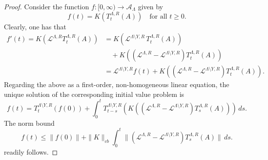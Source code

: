 \documentclass{article}
\newcommand{\A}{\mathcal{A}}
\newcommand{\lind}{\mathscr{L}}
\newcommand{\<}{\langle}
\renewcommand{\>}{\rangle}
\numberwithin{equation}{section}
\theoremstyle{definition}
\begin{document}
\begin{proof}
 Consider the function $f:[0,\infty) \to \A_{\Lambda}$ given by
    \begin{equation} \label{def_f}
        f(t) = K(T^{\Lambda, R}_t(A)) \quad \text{for all $t\ge 0$.}
    \end{equation}
Clearly, one has that 
    \begin{align*}
        f'(t) = K(\mathscr{L}^{\Lambda, R}T^{\Lambda, R}_t(A)) &= K( \mathscr{L}^{\Lambda \setminus Y, R}\, T^{\Lambda, R}_t(A))\\
        &\quad + K( (\mathscr{L}^{\Lambda, R} - \mathscr{L}^{\Lambda \setminus Y, R})T^{\Lambda, R}_t(A))\\
        &= \mathscr{L}^{\Lambda \setminus Y, R}f(t) + K( (\mathscr{L}^{\Lambda, R} - \mathscr{L}^{\Lambda \setminus Y, R})T^{\Lambda, R}_t(A)).
    \end{align*} 
Regarding the above as a first-order, non-homogeneous linear equation, the unique solution of the corresponding initial value problem is 
   \begin{equation}
        f(t) = T^{\Lambda \setminus Y, R}_t(f(0)) + \int_0^t T^{\Lambda \setminus Y, R}_{t-s}(K ((\lind^{\Lambda, R}- \lind^{\Lambda \setminus Y, R})T^{\Lambda, R}_s(A))) \, ds.
    \end{equation}  
The norm bound 
    \begin{equation}\label{sol_bd}
        f(t) \le \|f(0)\| + \|K\|_{cb}\int_0^t  \|(\lind^{\Lambda, R} - \lind^{\Lambda \setminus Y, R})T^{\Lambda, R}_s(A)\| \, ds.
    \end{equation} 
readily follows. 


\end{proof}
\end{document}

